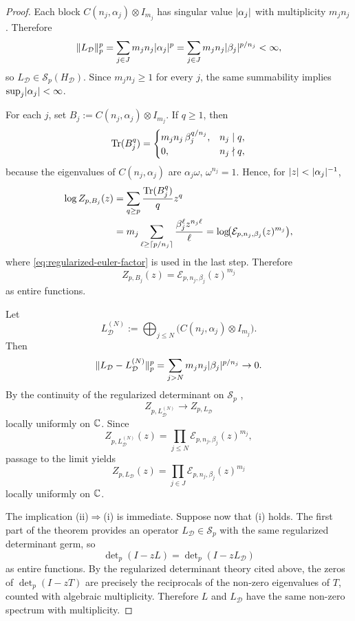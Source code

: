 \begin{proof}
  Each block \(C(n_j,\alpha_j)\otimes I_{m_j}\) has singular value
  \(\lvert \alpha_j \rvert\) with multiplicity \(m_jn_j\). Therefore
  \[
    \|L_{\mathcal D}\|_p^p
    =\sum_{j\in J}m_jn_j\lvert \alpha_j \rvert^p
    =\sum_{j\in J}m_jn_j\lvert \beta_j \rvert^{p/n_j}
    <\infty,
  \]
  so \(L_{\mathcal D}\in \mathcal S_p(H_{\mathcal D})\). Since
  \(m_jn_j\ge 1\) for every \(j\), the same summability implies
  \(
    \sup_j\lvert \alpha_j \rvert<\infty
  \).

  For each \(j\), set
  \(
    B_j:=C(n_j,\alpha_j)\otimes I_{m_j}
  \).
  If \(q\ge 1\), then
  \[
    \operatorname{Tr}(B_j^q)
    =
    \begin{cases}
      m_jn_j\,\beta_j^{q/n_j}, & n_j\mid q,\\
      0, & n_j\nmid q,
    \end{cases}
  \]
  because the eigenvalues of \(C(n_j,\alpha_j)\) are
  \(\alpha_j\omega\), \(\omega^{n_j}=1\). Hence, for
  \(\lvert z \rvert<\lvert \alpha_j \rvert^{-1}\),
  \begin{align*}
    \log Z_{p,B_j}(z)
    &=\sum_{q\ge p}\frac{\operatorname{Tr}(B_j^q)}{q}z^q \\
    &=m_j\sum_{\ell\ge \lceil p/n_j\rceil}
      \frac{\beta_j^\ell z^{n_j\ell}}{\ell}
     =\log\!\bigl(\mathcal E_{p,n_j,\beta_j}(z)^{m_j}\bigr),
  \end{align*}
  where \eqref{eq:regularized-euler-factor} is used in the last step.
  Therefore
  \[
    Z_{p,B_j}(z)=\mathcal E_{p,n_j,\beta_j}(z)^{m_j}
  \]
  as entire functions.

  Let
  \[
    L_{\mathcal D}^{(N)}
    :=\bigoplus_{j\le N}\bigl(C(n_j,\alpha_j)\otimes I_{m_j}\bigr).
  \]
  Then
  \[
    \|L_{\mathcal D}-L_{\mathcal D}^{(N)}\|_p^p
    =\sum_{j>N}m_jn_j\lvert \beta_j \rvert^{p/n_j}\to 0.
  \]
  By the continuity of the regularized determinant on \(\mathcal S_p\)
  \cite[Chapter~9]{Simon2005TraceIdeals},
  \[
    Z_{p,L_{\mathcal D}^{(N)}}\longrightarrow Z_{p,L_{\mathcal D}}
  \]
  locally uniformly on \(\mathbb{C}\). Since
  \[
    Z_{p,L_{\mathcal D}^{(N)}}(z)
    =\prod_{j\le N}\mathcal E_{p,n_j,\beta_j}(z)^{m_j},
  \]
  passage to the limit yields
  \[
    Z_{p,L_{\mathcal D}}(z)
    =\prod_{j\in J}\mathcal E_{p,n_j,\beta_j}(z)^{m_j}
  \]
  locally uniformly on \(\mathbb{C}\).

  The implication \textup{(ii)}\(\Rightarrow\)\textup{(i)} is immediate.
  Suppose now that \textup{(i)} holds. The first part of the theorem
  provides an operator \(L_{\mathcal D}\in\mathcal S_p\) with the same
  regularized determinant germ, so
  \[
    \det\nolimits_p(I-zL)=\det\nolimits_p(I-zL_{\mathcal D})
  \]
  as entire functions. By the regularized determinant theory cited
  above, the zeros of \(\det_p(I-zT)\) are precisely the reciprocals of
  the non-zero eigenvalues of \(T\), counted with algebraic
  multiplicity. Therefore \(L\) and \(L_{\mathcal D}\) have the same
  non-zero spectrum with multiplicity.


\end{proof}
